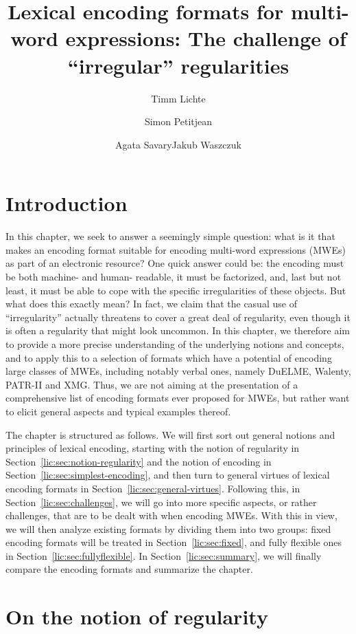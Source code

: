 \documentclass[output=paper]{langsci/langscibook}
\author{Timm Lichte\affiliation{University of Düsseldorf}\and Simon Petitjean\affiliation{University of Düsseldorf}\and Agata Savary\affiliation{University of Tours}\lastand Jakub Waszczuk\affiliation{Université of Tours\\University of Orléans}}
\title{Lexical encoding formats for multi-word expressions: The challenge of ``irregular'' regularities}
\begin{document}
\maketitle


%
\section{Introduction}

In this chapter, we seek to answer a seemingly simple question: what is it that makes an encoding format suitable for encoding multi-word expressions (MWEs) as part of an electronic resource? One quick answer could be: the encoding must be both machine- and human- readable, it must be factorized, and, last but not least, it must be able to cope with the specific irregularities of these objects. But what does this exactly mean? In fact, we claim that the casual use of ``irregularity'' actually threatens to cover a great deal of regularity, even though it is often a regularity that might look uncommon. In this chapter, we therefore aim to provide a more precise understanding of the underlying notions and concepts, and to apply this to a selection of formats which have a potential of encoding large classes of MWEs, including notably verbal ones, namely DuELME, Walenty, PATR-II and XMG. Thus, we are not aiming at the presentation of a comprehensive list of encoding formats ever proposed for MWEs, but rather want to elicit general aspects and typical examples thereof. 

The chapter is structured as follows. We will first sort out general notions and principles of lexical encoding, starting with the notion of regularity in Section~\ref{lic:sec:notion-regularity} and the notion of encoding in Section~\ref{lic:sec:simplest-encoding}, and then turn to general virtues of lexical encoding formats in Section~\ref{lic:sec:general-virtues}. Following this, in Section~\ref{lic:sec:challenges}, we will go into more specific aspects, or rather challenges, that are to be dealt with when encoding MWEs. With this in view, we will then analyze existing formats by dividing them into two groups: fixed encoding formats will be treated in Section~\ref{lic:sec:fixed}, and fully flexible ones in Section~\ref{lic:sec:fullyflexible}. In Section~\ref{lic:sec:summary}, we will finally compare the encoding formats and summarize the chapter.

\section{ On the notion of regularity}\largerpage
\label{lic:sec:notion-regularity}
\end{document}
